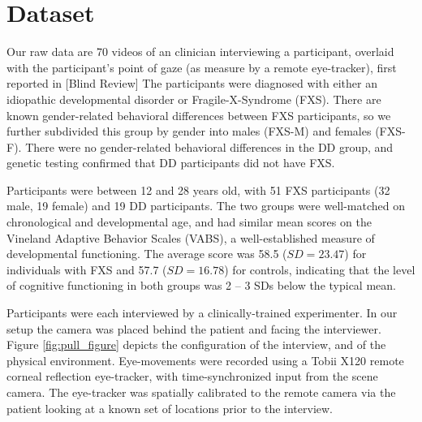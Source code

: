 \documentclass{llncs}
\begin{document}
  \section{Dataset}
  \vspace{-1.5em}
  Our raw data are 70 videos of an clinician interviewing a participant, overlaid with the participant's point of gaze (as measure by a remote eye-tracker), first reported in [Blind Review]%
  The participants were diagnosed with either an idiopathic developmental disorder or Fragile-X-Syndrome (FXS). There are known gender-related behavioral differences between FXS participants, so we further subdivided this group by gender into males (FXS-M) and females (FXS-F). There were no gender-related behavioral differences in the DD group, and genetic testing confirmed that DD participants did not have FXS.

  Participants were between 12 and 28 years old, with 51 FXS participants (32 male, 19 female) and 19 DD participants. The two groups were well-matched on chronological and developmental age, and had similar mean scores on the Vineland Adaptive Behavior Scales (VABS), a well-established measure of developmental functioning. The average score was 58.5 ($SD = 23.47$) for individuals with FXS and 57.7 ($SD= 16.78$) for controls, indicating that the level of cognitive functioning in both groups was 2 -- 3 SDs below the typical mean.

  Participants were each interviewed by a clinically-trained experimenter. In our setup the camera was placed behind the patient and facing the interviewer. Figure \ref{fig:pull_figure} depicts the configuration of the interview, and of the physical environment. Eye-movements were recorded using a Tobii X120 remote corneal reflection eye-tracker, with time-synchronized input from the scene camera. The eye-tracker was spatially calibrated to the remote camera via the patient looking at a known set of locations prior to the interview.
\end{document}
